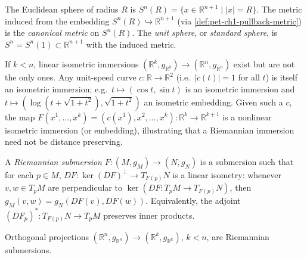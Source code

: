 \begin{example}
  \label{ex:pet-ch1-sphere}
  \leanok
  The Euclidean sphere of radius $R$ is $S^n(R)=\{x\in\mathbb{R}^{n+1}\mid|x|=R\}$. The
  metric induced from the embedding $S^n(R)\hookrightarrow\mathbb{R}^{n+1}$ (via
  \cref{def:pet-ch1-pullback-metric}) is the \emph{canonical metric} on $S^n(R)$.
  The \emph{unit sphere}, or \emph{standard sphere}, is $S^n=S^n(1)\subset\mathbb{R}^{n+1}$
  with the induced metric.
\end{example}

\begin{remark}
  \label{rem:pet-ch1-nonlinear-isometric-immersion}
  \leanok
  If $k<n$, linear isometric immersions $(\mathbb{R}^k,g_{\mathbb{R}^k})\to(\mathbb{R}^n,g_{\mathbb{R}^n})$
  exist but are not the only ones. Any unit-speed curve $c:\mathbb{R}\to\mathbb{R}^2$
  (i.e.\ $|\dot c(t)|=1$ for all $t$) is itself an isometric immersion; e.g.\
  $t\mapsto(\cos t,\sin t)$ is an isometric immersion and
  $t\mapsto(\log(t+\sqrt{1+t^2}),\sqrt{1+t^2})$ an isometric embedding. Given such
  a $c$, the map $F(x^1,\dots,x^k)=(c(x^1),x^2,\dots,x^k):\mathbb{R}^k\to\mathbb{R}^{k+1}$
  is a nonlinear isometric immersion (or embedding), illustrating that a
  Riemannian immersion need not be distance preserving.
\end{remark}

\begin{definition}
  \label{def:pet-ch1-riemannian-submersion}
  \leanok
  A \emph{Riemannian submersion} $F:(M,g_M)\to(N,g_N)$ is a submersion such that
  for each $p\in M$, $DF:\ker(DF)^\perp\to T_{F(p)}N$ is a linear isometry:
  whenever $v,w\in T_pM$ are perpendicular to $\ker(DF:T_pM\to T_{F(p)}N)$, then
  $g_M(v,w)=g_N(DF(v),DF(w))$. Equivalently, the adjoint
  $(DF_p)^*:T_{F(p)}N\to T_pM$ preserves inner products.
\end{definition}

\begin{example}
  \label{ex:pet-ch1-orthogonal-projection}
  \leanok
  Orthogonal projections $(\mathbb{R}^n,g_{\mathbb{R}^n})\to(\mathbb{R}^k,g_{\mathbb{R}^k})$, $k<n$, are
  Riemannian submersions.
\end{example}

